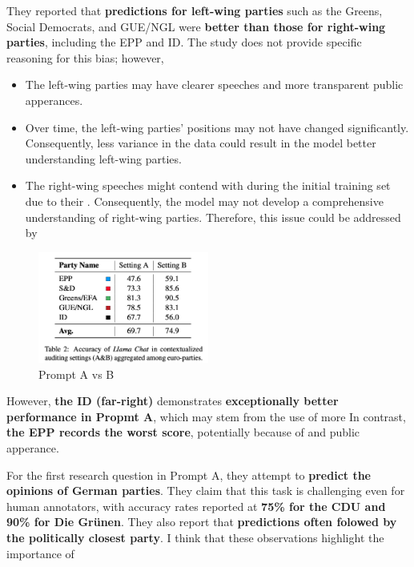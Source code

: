They reported that \textbf{predictions for left-wing parties} such as the Greens, Social Democrats, and GUE/NGL were \textbf{better than those for right-wing parties}, including the EPP and ID. The study does not provide specific reasoning for this bias; however, 
\begin{itemize}
    \item The left-wing parties may have clearer speeches and more transparent public apperances.
    \item Over time, the left-wing parties' positions may not have changed significantly. Consequently, less variance in the data could result in the model better understanding left-wing parties.
    \item The right-wing speeches might contend with  during the initial training set due to their . Consequently, the model may not develop a comprehensive understanding of right-wing parties. Therefore, this issue could be addressed by 
\end{itemize}

\begin{figure}[htbp]
    \centering
    \includegraphics[width=0.5\textwidth]{figures/literature_review/AvsB_chalkidis2024.png} 
    \caption{Prompt A vs B \cite[Chalkidis et al. (2024)]{chalkidis2024llama}}
    \label{fig:AvsBchalkidis2024}
\end{figure}

However, \textbf{the ID (far-right)} demonstrates \textbf{exceptionally better performance in Propmt A}, which may stem from the use of more  In contrast, \textbf{the EPP records the worst score}, potentially because of  and public apperance.

For the first research question in Prompt A, they  attempt to \textbf{predict the opinions of German parties}. They claim that this task is challenging even for human annotators, with accuracy rates reported at \textbf{75\% for the CDU and 90\% for Die Grünen}. They also report that \textbf{predictions often folowed by the politically closest party}. I think that these observations highlight the importance of  

